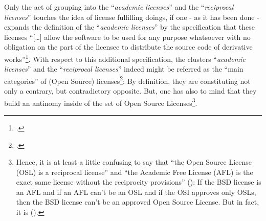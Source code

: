 Only the act of grouping into the \enquote{\emph{academic licenses}} and the
\enquote{\emph{reciprocal licenses}} touches the idea of license fulfilling
doings, if one - as it has been done - expands the definition of the
\enquote{\emph{academic licenses}} by the specification that these licenses
\enquote{[\ldots] allow the software to be used for any purpose whatsoever with
no obligation on the part of the licensee to distribute the source code of
derivative works}\footcite[cf.][71]{Rosen2005a}. With respect to this additional
specification, the clusters \enquote{\emph{academic licenses}} and the
\enquote{\emph{reciprocal licenses}} indeed might be referred as the
\enquote{main categories} of (Open Source)
licenses\footcite[cf.][179]{Rosen2005a}: By definition, they are constituting
not only a contrary, but contradictory opposite. But, one has also to mind that
they build an antinomy inside of the set of Open Source Licenses\footnote{Hence,
it is at least a little confusing to say that \enquote{the Open Source License
(OSL) is a reciprocal license} and \enquote{the Academic Free License (AFL) is
the exact same license without the reciprocity provisions}
(\cite[cf.][180]{Rosen2005a}): If the BSD license is an AFL and if an AFL can't
be an OSL and if the OSI approves only OSLs, then the BSD license can't be an
approved Open Source License. But in fact, it is (\cite[cf.][\nopage
wp]{OSI2012b}).}.

